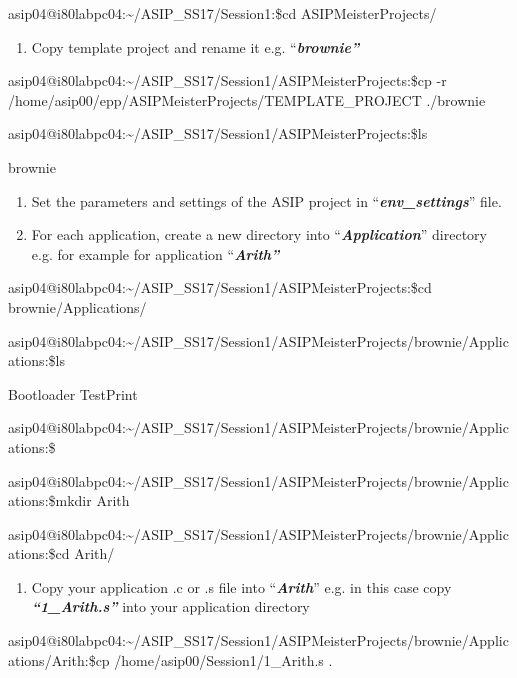 \documentclass[
]{article}
\begin{document}
asip04@i80labpc04:\textasciitilde/ASIP\_SS17/Session1:\$cd
ASIPMeisterProjects/

\begin{enumerate}
\def\labelenumi{\arabic{enumi}.}
\setcounter{enumi}{5}
\item
  Copy template project and rename it e.g. ``\emph{\textbf{brownie''}}
\end{enumerate}

asip04@i80labpc04:\textasciitilde/ASIP\_SS17/Session1/ASIPMeisterProjects:\$cp
-r /home/asip00/epp/ASIPMeisterProjects/TEMPLATE\_PROJECT ./brownie

asip04@i80labpc04:\textasciitilde/ASIP\_SS17/Session1/ASIPMeisterProjects:\$ls

brownie

\begin{enumerate}
\def\labelenumi{\arabic{enumi}.}
\setcounter{enumi}{6}
\item
  Set the parameters and settings of the ASIP project in
  ``\emph{\textbf{env\_settings}}'' file.
\item
  For each application, create a new directory into
  ``\emph{\textbf{Application}}'' directory e.g. for example for
  application ``\emph{\textbf{Arith''}}
\end{enumerate}

asip04@i80labpc04:\textasciitilde/ASIP\_SS17/Session1/ASIPMeisterProjects:\$cd
brownie/Applications/

asip04@i80labpc04:\textasciitilde/ASIP\_SS17/Session1/ASIPMeisterProjects/brownie/Applications:\$ls

Bootloader TestPrint

asip04@i80labpc04:\textasciitilde/ASIP\_SS17/Session1/ASIPMeisterProjects/brownie/Applications:\$

asip04@i80labpc04:\textasciitilde/ASIP\_SS17/Session1/ASIPMeisterProjects/brownie/Applications:\$mkdir
Arith

asip04@i80labpc04:\textasciitilde/ASIP\_SS17/Session1/ASIPMeisterProjects/brownie/Applications:\$cd
Arith/

\begin{enumerate}
\def\labelenumi{\arabic{enumi}.}
\setcounter{enumi}{8}
\item
  Copy your application .c or .s file into ``\emph{\textbf{Arith}}''
  e.g. in this case copy \emph{\textbf{``1\_Arith.s''}} into your
  application directory
\end{enumerate}

asip04@i80labpc04:\textasciitilde/ASIP\_SS17/Session1/ASIPMeisterProjects/brownie/Applications/Arith:\$cp
/home/asip00/Session1/1\_Arith.s .
\end{document}
